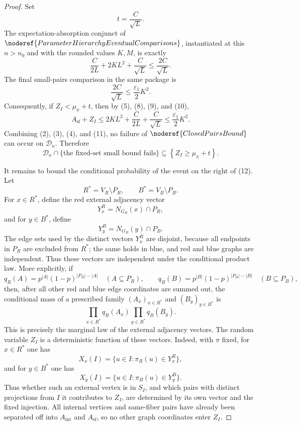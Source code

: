 \begin{proof}
Set
\[
t=\frac{C}{\sqrt L}.
\]
The expectation-absorption conjunct of
\(\noderef{ParameterHierarchyEventualComparisons}\), instantiated at this
\(n>n_0\) and with the rounded values \(K,M\), is exactly
\[
\frac{C}{2L}+2K L^2+\frac{C}{\sqrt L}
\le \frac{2C}{\sqrt L}. \tag{9}
\]
The final small-pairs comparison in the same package is
\[
\frac{2C}{\sqrt L}\le\frac{\varepsilon_1}{2}K^2. \tag{10}
\]
Consequently, if \(Z_I<\mu_\pi+t\), then by (5), (8), (9), and (10),
\[
A_{\mathrm{sf}}+Z_I
\le 2K L^2+\frac{C}{2L}+\frac{C}{\sqrt L}
\le \frac{\varepsilon_1}{2}K^2. \tag{11}
\]
Combining (2), (3), (4), and (11), no failure of
\(\noderef{ClosedPairsBound}\) can occur on \(\mathcal D_n\).  Therefore
\[
\mathcal D_n\cap\{\text{the fixed-set small bound fails}\}
\subseteq
\left\{Z_I\ge\mu_\pi+t\right\}. \tag{12}
\]

It remains to bound the conditional probability of the event on the right of
(12).  Let
\[
R^\ast=V_R\setminus P_R,\qquad B^\ast=V_B\setminus P_B.
\]
For \(x\in R^\ast\), define the red external adjacency vector
\[
Y_x^R=N_{G_R}(x)\cap P_R,
\]
and for \(y\in B^\ast\), define
\[
Y_y^B=N_{G_B}(y)\cap P_B.
\]
The edge sets used by the distinct vectors \(Y_x^R\) are disjoint, because
all endpoints in \(P_R\) are excluded from \(R^\ast\); the same holds in blue,
and red and blue graphs are independent.  Thus these vectors are independent
under the conditional product law.  More explicitly, if
\[
q_R(A)=p^{|A|}(1-p)^{|P_R|-|A|}\quad(A\subseteq P_R),
\qquad
q_B(B)=p^{|B|}(1-p)^{|P_B|-|B|}\quad(B\subseteq P_B),
\]
then, after all other red and blue edge coordinates are summed out, the
conditional mass of a prescribed family
\((A_x)_{x\in R^\ast}\) and \((B_y)_{y\in B^\ast}\) is
\[
\prod_{x\in R^\ast}q_R(A_x)\prod_{y\in B^\ast}q_B(B_y). \tag{13}
\]
This is precisely the marginal law of the external adjacency vectors.  The
random variable \(Z_I\) is a deterministic function of these vectors.  Indeed,
with \(\pi\) fixed, for \(x\in R^\ast\) one has
\[
X_x(I)=\{u\in I:\pi_R(u)\in Y_x^R\},
\]
and for \(y\in B^\ast\) one has
\[
X_y(I)=\{u\in I:\pi_B(u)\in Y_y^B\}.
\]
Thus whether such an external vertex is in \(S_I\), and which pairs with
distinct projections from \(I\) it contributes to \(Z_I\), are determined by its
own vector and the fixed injection.  All internal vertices and same-fiber
pairs have already been separated off into \(A_{\mathrm{int}}\) and
\(A_{\mathrm{sf}}\), so no other graph coordinates enter \(Z_I\).


\end{proof}
